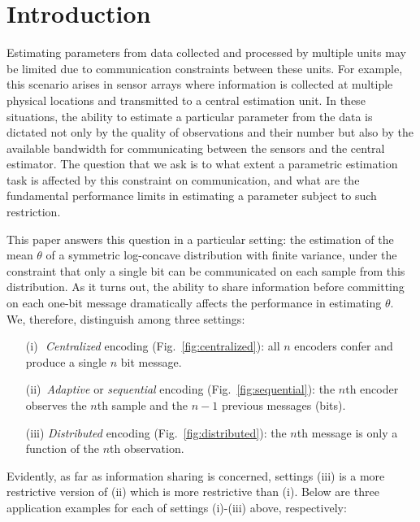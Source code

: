\documentclass[letterpaper, 11pt]{IEEEtran}      %
\begin{document}
\section{Introduction}
\label{sec:Intro}
Estimating parameters from data collected and processed by multiple units may be limited due to communication constraints between these units. 
%
For example, this scenario arises in sensor arrays where information is collected at multiple physical locations and transmitted to a central estimation unit. In these situations, the ability to estimate a particular parameter from the data is dictated not only by the quality of observations and their number but also by the available bandwidth for communicating between the sensors and the central estimator. The question that we ask is to what extent a parametric estimation task is affected by this constraint on communication, and what are the fundamental performance limits in estimating a parameter subject to such restriction. \par
This paper answers this question in a particular setting: the estimation of the mean $\theta$ of a symmetric log-concave distribution with finite variance, under the constraint that only a single bit can be communicated on each sample from this distribution. As it turns out, the ability to share information before committing on each one-bit message dramatically affects the performance in estimating $\theta$. We, therefore, distinguish among three settings:
\begin{itemize}
 \item[(i)\,\,] \emph{Centralized} encoding (Fig.~\ref{fig:centralized}): all $n$ encoders confer and produce a single $n$ bit message. 
 \item[(ii)\,] \emph{Adaptive} or \emph{sequential} encoding (Fig.~\ref{fig:sequential}): the $n$th encoder observes the $n$th sample and the $n-1$ previous messages (bits).
 \item[(iii)] \emph{Distributed} encoding (Fig.~\ref{fig:distributed}): the $n$th message is only a function of the $n$th observation.
 \end{itemize}
Evidently, as far as information sharing is concerned, settings (iii) is a more restrictive version of (ii) which is more restrictive than (i). Below are three application examples for each of settings (i)-(iii) above, respectively:
\end{document}
